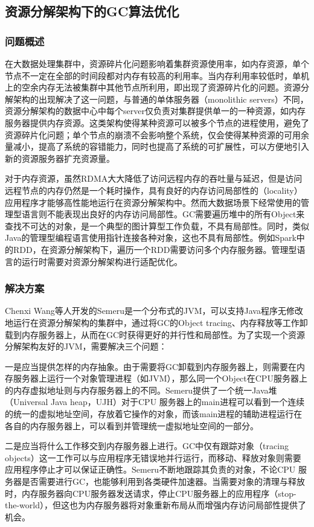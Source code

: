 \documentclass[lang=cn,12pt,a4paper,cite=authoryear]{elegantpaper}
\begin{document}
\subsection{资源分解架构下的GC算法优化}
\subsubsection{问题概述}
在大数据处理集群中，资源碎片化问题影响着集群资源使用率，如内存资源，单个节点不一定在全部的时间段都对内存有较高的利用率。当内存利用率较低时，单机上的空余内存无法被集群中其他节点所利用，即出现了资源碎片化的问题。资源分解架构的出现解决了这一问题，与普通的单体服务器（monolithic servers）不同，资源分解架构的数据中心中每个server仅负责对集群提供单一的一种资源，如内存服务器提供内存资源。这类架构使得某种资源可以被多个节点的进程使用，避免了资源碎片化问题；单个节点的崩溃不会影响整个系统，仅会使得某种资源的可用余量减小，提高了系统的容错能力，同时也提高了系统的可扩展性，可以方便地引入新的资源服务器扩充资源量。

对于内存资源，虽然RDMA大大降低了访问远程内存的吞吐量与延迟，但是访问远程节点的内存仍然是一个耗时操作，具有良好的内存访问局部性的（locality）应用程序才能够高性能地运行在资源分解架构中。然而大数据场景下经常使用的管理型语言则不能表现出良好的内存访问局部性。GC需要遍历堆中的所有Object来查找不可达的对象，是一个典型的图计算型工作负载，不具有局部性。同时，类似Java的管理型编程语言使用指针连接各种对象，这也不具有局部性。例如Spark中的RDD，在资源分解架构下，遍历一个RDD需要访问多个内存服务器。管理型语言的运行时需要对资源分解架构进行适配优化。

\subsubsection{解决方案}
Chenxi Wang等人开发的Semeru\cite{semeru}是一个分布式的JVM，可以支持Java程序无修改地运行在资源分解架构的集群中，通过将GC的Object tracing、内存释放等工作卸载到内存服务器上，从而在GC时获得更好的并行性和局部性。为了实现一个资源分解架构友好的JVM，需要解决三个问题：

一是应当提供怎样的内存抽象。由于需要将GC卸载到内存服务器上，则需要在内存服务器上运行一个对象管理进程（如JVM），那么同一个Object在CPU服务器上的内存虚拟地址则与内存服务器上的不同。Semeru提供了一个统一Java堆（Universal Java heap，UJH）对于CPU 服务器上的main进程可以看到一个连续的统一的虚拟地址空间，存放着它操作的对象，而该main进程的辅助进程运行在各自的内存服务器上，可以看到并管理统一虚拟地址空间的一部分。

二是应当将什么工作移交到内存服务器上进行。GC中仅有跟踪对象（tracing objects）这一工作可以与应用程序无错误地并行运行，而移动、释放对象则需要应用程序停止才可以保证正确性。Semeru不断地跟踪其负责的对象，不论CPU 服务器是否需要进行GC，也能够利用到各类硬件加速器。当需要对象的清理与释放时，内存服务器向CPU服务器发送请求，停止CPU服务器上的应用程序（stop-the-world），但这也为内存服务器将对象重新布局从而增强内存访问局部性提供了机会。
\end{document}
